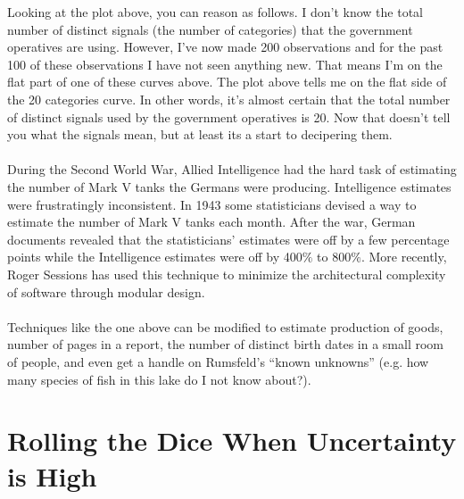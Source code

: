 \documentclass{article}
\begin{document}
\begin{doublespace}
\noindent\(\begin{array}{cc}
  &  \\
\end{array}\)
\end{doublespace}

Looking at the plot above, you can reason as follows. I don{'}t know the total number of distinct signals (the number of categories) that the government
operatives are using. However, I{'}ve now made 200 observations and for the past 100 of these observations I have not seen anything new. That means
I{'}m on the flat part of one of these curves above. The plot above tells me on the flat side of the 20 categories curve. In other words, it{'}s
almost certain that the total number of distinct signals used by the government operatives is 20. Now that doesn{'}t tell you what the signals mean,
but at least its a start to decipering them.\\
\\
During the Second World War, Allied Intelligence had the hard task of estimating the number of Mark V tanks the Germans were producing. Intelligence
estimates were frustratingly inconsistent. In 1943 some statisticians devised a way to estimate the number of Mark V tanks each month. After the
war, German documents revealed that the statisticians{'} estimates were off by a few percentage points while the Intelligence estimates were off
by 400$\%$ to 800$\%$. More recently, Roger Sessions has used this technique to minimize the architectural complexity of software through modular
design.\\
\\
Techniques like the one above can be modified to estimate production of goods, number of pages in a report, the number of distinct birth dates in
a small room of people, and even get a handle on Rumsfeld{'}s {``}known unknowns{''} (e.g. how many species of fish in this lake do I not know about?).

\section*{Rolling the Dice When Uncertainty is High}
\end{document}
